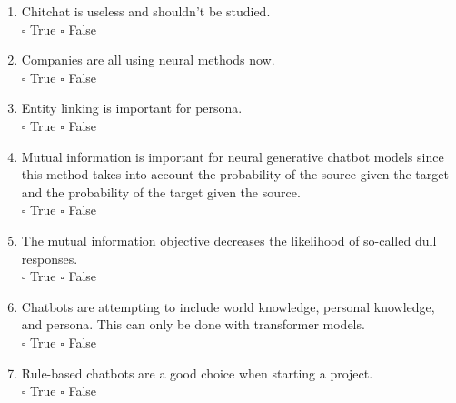 \documentclass[12pt]{article}
\begin{document}
\begin{enumerate}
\begin{enumerate}
    \item Chitchat is useless and shouldn't be studied.\\[2mm] {$\square$ True $\square$ False}

    \item Companies are all using neural methods now. \\[2mm]
    {$\square$ True $\square$ False}
    
    \item Entity linking is important for persona.\\[2mm] {$\square$ True $\square$ False}
    
    \item Mutual information is important for neural generative chatbot models since this method takes into account the probability of the source given the target and the probability of the target given the source.\\[2mm] {$\square$ True $\square$ False}
    
    \item The mutual information objective decreases the likelihood of so-called dull responses.\\[2mm] {$\square$ True $\square$ False}
    
    \item Chatbots are attempting to include world knowledge, personal knowledge, and persona. This can only be done with transformer models. \\[2mm] 
    {$\square$ True $\square$ False}
    \item Rule-based chatbots are a good choice when starting a project. \\[2mm] {$\square$ True $\square$ False}
    

\end{enumerate}

\end{enumerate}
\end{document}
